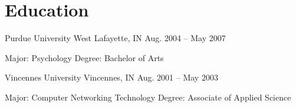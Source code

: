 \documentclass[9pt]{extarticle} %
\begin{document}

\section{Education}

Purdue University \tab West Lafayette, IN \tab Aug. 2004 -- May 2007\\
\begin{indented}
	Major: Psychology \tabto{8cm} Degree: Bachelor of Arts
\end{indented}

\bigskip


Vincennes University \tab Vincennes, IN \tab Aug. 2001 -- May 2003\\
\begin{indented}
	Major: Computer Networking Technology \tabto{8cm} Degree: Associate of Applied Science
\end{indented}

\end{document}
